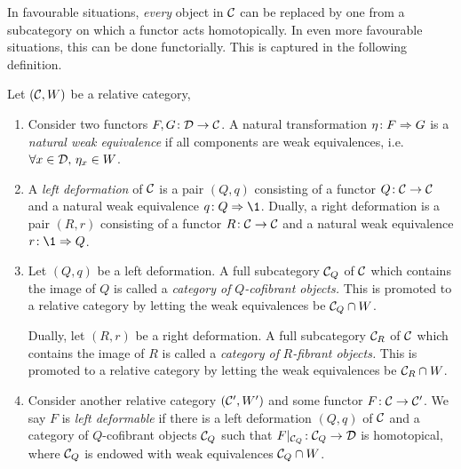 In favourable situations, \emph{every} object in \(\mathcal{C}\) can be replaced by one from a subcategory on which a functor acts homotopically. In even more favourable situations, this can be done functorially. This
is captured in the following definition.
\begin{definition}
	Let \((\mathcal{C},W)\) be a relative category,
	\begin{enumerate}[label=(\arabic*)]
	\item Consider two functors \(F,G\!:\mathcal{D}\to\mathcal{C}\). A natural transformation \(\eta\!:F\Rightarrow G\) is a \emph{natural weak equivalence} if all components
	are weak equivalences, i.e.\ \(\forall x\in\mathcal{D},\, \eta_x\in W\).
	\item A \emph{left deformation} of \(\mathcal{C}\) is a pair \((Q,q)\) consisting of a functor \(Q\!:\mathcal{C}\to\mathcal{C}\) and a natural weak equivalence \(q\!:Q\To\1\). Dually, a right deformation
	is a pair \((R,r)\) consisting of a functor \(R\!:\mathcal{C}\to\mathcal{C}\) and a natural weak equivalence \(r\!:\1\To Q\).
	\item Let \((Q,q)\) be a left deformation. A full subcategory \(\mathcal{C}_Q\) of \(\mathcal{C}\) which contains the image of \(Q\) is called a \emph{category of} \(Q\)\emph{-cofibrant objects.} This is promoted to a relative category
	by letting the weak equivalences be \(\mathcal{C}_Q\cap W\).

	Dually, let \((R,r)\) be a right deformation. A full subcategory \(\mathcal{C}_R\) of \(\mathcal{C}\) which contains the image of \(R\) is called a \emph{category of} \(R\)\emph{-fibrant objects.} This is promoted to a relative
	category by letting the weak equivalences be \(\mathcal{C}_R\cap W\).
	\item Consider another relative category \((\mathcal{C}',W')\) and some functor \(F\!:\mathcal{C}\to\mathcal{C}'\). We say \(F\) is \emph{left deformable} if there is a left deformation \((Q,q)\) of \(\mathcal{C}\)
	and a category of \(Q\)-cofibrant objects \(\mathcal{C}_Q\) such that \(F|_{\mathcal{C}_Q}\!:\mathcal{C}_Q\to\mathcal{D}\) is homotopical, where \(\mathcal{C}_Q\) is endowed with weak equivalences \(\mathcal{C}_Q\cap W\).
	\end{enumerate}
\end{definition}

